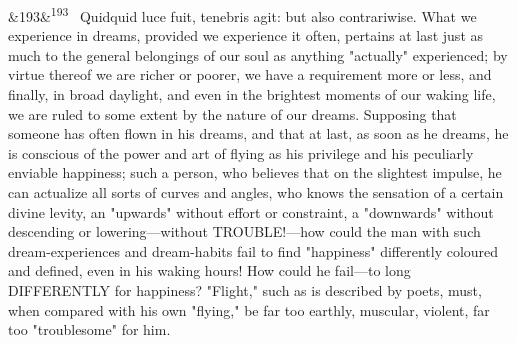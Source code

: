 \documentclass[12pt]{article}
\newcommand{\para}[1][]{\par\noindent\ifx&#1&\else\textsuperscript{\footnotesize #1}~\fi}
\begin{document}
\para[193] Quidquid luce fuit, tenebris agit: but also contrariwise. What we experience in dreams, provided we experience it often, pertains at last just as much to the general belongings of our soul as anything "actually" experienced; by virtue thereof we are richer or poorer, we have a requirement more or less, and finally, in broad daylight, and even in the brightest moments of our waking life, we are ruled to some extent by the nature of our dreams. Supposing that someone has often flown in his dreams, and that at last, as soon as he dreams, he is conscious of the power and art of flying as his privilege and his peculiarly enviable happiness; such a person, who believes that on the slightest impulse, he can actualize all sorts of curves and angles, who knows the sensation of a certain divine levity, an "upwards" without effort or constraint, a "downwards" without descending or lowering---without TROUBLE!---how could the man with such dream-experiences and dream-habits fail to find "happiness" differently coloured and defined, even in his waking hours! How could he fail---to long DIFFERENTLY for happiness? "Flight," such as is described by poets, must, when compared with his own "flying," be far too earthly, muscular, violent, far too "troublesome" for him.
\end{document}
